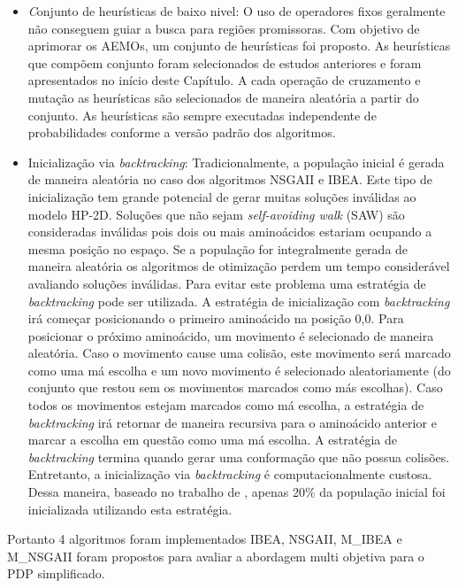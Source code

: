  
 \begin{itemize}
 		
		\item \textit Conjunto de heurísticas de baixo nivel: O uso de operadores fixos geralmente não conseguem guiar a busca para regiões promissoras. 
		Com objetivo de aprimorar os AEMOs, um conjunto de heurísticas foi proposto. As heurísticas que compõem conjunto foram selecionados de estudos anteriores e foram apresentados no início deste Capítulo. A cada operação de cruzamento e mutação as heurísticas são selecionados de maneira aleatória a partir do conjunto. As heurísticas são sempre executadas independente de probabilidades conforme a versão padrão dos algoritmos. 
	
		
		\item Inicialização via \textit{backtracking}: Tradicionalmente, a população inicial é gerada de maneira aleatória no caso dos algoritmos NSGAII e IBEA. Este tipo de inicialização tem grande potencial de gerar muitas soluções inválidas ao  modelo HP-2D. Soluções que não sejam \textit{self-avoiding walk} (SAW) são consideradas inválidas pois dois ou mais aminoácidos estariam ocupando a mesma posição no espaço. Se a população for integralmente gerada de maneira aleatória os algoritmos de otimização perdem um tempo considerável avaliando soluções inválidas. Para evitar este problema uma estratégia de \textit{backtracking} pode ser utilizada. A estratégia de inicialização com \textit{backtracking} irá começar posicionando o primeiro aminoácido na posição 0,0. Para posicionar o próximo aminoácido, um movimento é selecionado de maneira aleatória. Caso o movimento cause uma colisão, este movimento será marcado como uma má escolha e um novo movimento é selecionado aleatoriamente (do conjunto que restou sem os movimentos marcados como más escolhas). Caso todos os movimentos estejam marcados como má escolha, a estratégia de \textit{backtracking} irá retornar de maneira recursiva para o aminoácido anterior e marcar a escolha em questão como uma má escolha. A estratégia de \textit{backtracking} termina quando gerar uma conformação que não possua colisões. Entretanto, a inicialização via \textit{backtracking} é computacionalmente custosa. Dessa maneira, baseado no trabalho de \cite{benitez2015algoritmo}, apenas 20\% da população inicial foi inicializada utilizando esta estratégia.

\end{itemize}

Portanto 4 algoritmos foram implementados IBEA, NSGAII, M\_IBEA e M\_NSGAII foram propostos para avaliar a abordagem multi objetiva para o PDP simplificado.


